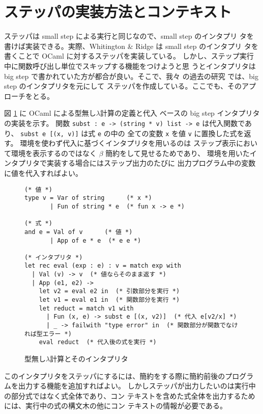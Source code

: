\section{ステッパの実装方法とコンテキスト}
\label{section:context}

ステッパは small step による実行と同じなので、small step のインタプリ
タを書けば実装できる。実際、Whitington \& Ridge \cite{EPTCS294.3} は small step のインタプリ
タを書くことで OCaml に対するステッパを実装している。
しかし、ステップ実行中に関数呼び出し単位でスキップする機能をつけようと思
うとインタプリタは big step で書かれていた方が都合が良い。そこで、我々
の過去の研究 \cite{FCA19} では、big step のインタプリタを元にして
ステッパを作成している。ここでも、そのアプローチをとる。

図 \ref{figure:lambda} に OCaml による型無し$\lambda$計算の定義と代入
ベースの big step インタプリタの実装を示す。
関数 \texttt{subst :\ e -> (string * v) list -> e} は代入関数であり、
\texttt{subst e [(x, v)]} は式 \texttt{e} の中の
全ての変数 \texttt{x} を値 \texttt{v} に置換した式を返す。
環境を使わず代入に基づくインタプリタを用いるのは
ステップ表示において環境を表示するのではなく $\beta$ 簡約をして見せるためであり、
環境を用いたインタプリタで実装する場合にはステップ出力のたびに
出力プログラム中の変数に値を代入すればよい。

\begin{figure}
\begin{spacing}{0.8}
\begin{verbatim}
(* 値 *)
type v = Var of string      (* x *)
       | Fun of string * e  (* fun x -> e *)

(* 式 *)
and e = Val of v      (* 値 *)
       | App of e * e  (* e e *)

(* インタプリタ *)
let rec eval (exp : e) : v = match exp with
  | Val (v) -> v  (* 値ならそのまま返す *)
  | App (e1, e2) ->
    let v2 = eval e2 in  (* 引数部分を実行 *)
    let v1 = eval e1 in  (* 関数部分を実行 *)
    let reduct = match v1 with
      | Fun (x, e) -> subst e [(x, v2)]  (* 代入 e[v2/x] *)
      | _ -> failwith "type error" in  (* 関数部分が関数でなければ型エラー *)
    eval reduct  (* 代入後の式を実行 *)
\end{verbatim}
\caption{型無し$\lambda$計算とそのインタプリタ}
\label{figure:lambda}
\end{spacing}
\end{figure}

このインタプリタをステッパにするには、簡約をする際に簡約前後のプログラ
ムを出力する機能を追加すればよい。
しかしステッパが出力したいのは実行中の部分式ではなく式全体であり、コン
テキストを含めた式全体を出力するためには、実行中の式の構文木の他にコン
テキストの情報が必要である。

